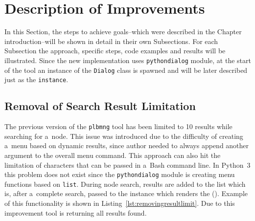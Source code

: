 \section{Description of Improvements}
\label{section:implementapproach}
In this Section, the steps to achieve goals--which were described in the Chapter introduction--will be shown in detail in their own Subsections. For each Subsection the approach, specific steps, code examples and results will be illustrated. Since the new implementation uses \texttt{pythondialog} module, at the start of the tool an instance of the \texttt{Dialog} class is spawned and will be later described just as the \texttt{instance}.
\subsection{Removal of Search Result Limitation}
The previous version of the \texttt{plbmng} tool has been limited to 10 results while searching for a~node. This issue was introduced due to the difficulty of creating a~menu based on dynamic results, since author needed to always append another argument to the overall menu command. This approach can also hit the limitation of characters that can be passed in a~Bash command line. In Python~3 this problem does not exist since the \texttt{pythondialog} module is creating menu functions based on \texttt{list}. During node search, results are added to the list which is, after a~complete search, passed to the instance which renders the  (). Example of this functionality is shown in Listing~\ref{lst:removingresultlimit}. Due to this improvement tool is returning all results found.

